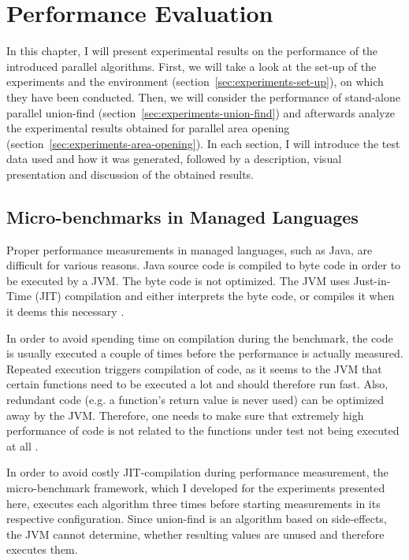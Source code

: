 \chapter{Performance Evaluation}
\label{chpt:experiments}

In this chapter, I will present experimental results on the performance of the
introduced parallel algorithms. First, we will take a look at the set-up of the
experiments and the environment (section~\ref{sec:experiments-set-up}), on which
they have been conducted. Then, we will consider the performance of stand-alone
parallel union-find (section~\ref{sec:experiments-union-find}) and afterwards
analyze the experimental results obtained for parallel area opening
(section~\ref{sec:experiments-area-opening}). In each section, I will introduce
the test data used and how it was generated, followed by a description, visual
presentation and discussion of the obtained results.

\section{Micro-benchmarks in Managed Languages}
\label{sec:experiments-microbenchmarks}

Proper performance measurements in managed languages, such as Java, are
difficult for various reasons. Java source code is compiled to byte code in
order to be executed by a JVM. The byte code is not optimized. The JVM uses
Just-in-Time (JIT) compilation and either interprets the byte code, or compiles
it when it deems this necessary \cite{Sestoft2013Microbenchmarks}.

In order to avoid spending time on compilation during the benchmark, the code is
usually executed a couple of times before the performance is actually
measured. Repeated execution triggers compilation of code, as it seems to the
JVM that certain functions need to be executed a lot and should therefore run
fast. Also, redundant code (e.g. a function's return value is never used) can be
optimized away by the JVM. Therefore, one needs to make sure that extremely high
performance of code is not related to the functions under test not being
executed at all \cite{Sestoft2013Microbenchmarks}.

In order to avoid costly JIT-compilation during performance measurement, the
micro-benchmark framework, which I developed for the experiments presented here,
executes each algorithm three times before starting measurements in its
respective configuration. Since union-find is an algorithm based on
side-effects, the JVM cannot determine, whether resulting values are unused and
therefore executes them.

